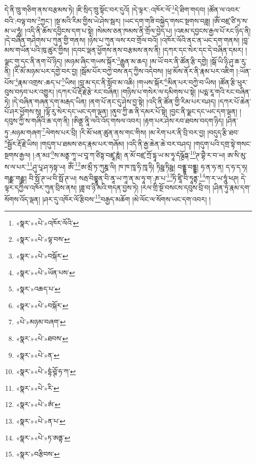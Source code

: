 དེ་ནི་ཁྲུ་གཅིག་ནས་བརྩམས་ཏེ། །ཇི་སྲིད་ཁྲུ་སྟོང་བར་དུའོ། །དེ་ལྟར་:འཁོར་ལོ་\footnote{«སྣར་»«པེ་»འཁོར་ལོའི་}དེ་ཐིག་གདབ། །ཚོན་ལ་འབར་བའི་:བལྟ་བས་\footnote{«སྣར་»«པེ་»ལྟ་བས་}ཀྱང་། །སྔ་མའི་རིམ་གྱིས་ཡེ་ཤེས་སྦར། །ཡང་དག་གཟི་བསྐྱེད་གསང་སྔགས་བཟླ། །ཨོཾ་བཛྲ་ཙི་ཏྲ་ས་མ་ཡ་ཧཱུཾ། །འདི་ནི་ཆོས་དབྱིངས་དག་པ་སྟེ། །སེམས་ཅན་ཁམས་ནི་གྲོལ་བྱེད་པ། །འཇམ་དབྱངས་རྒྱལ་པོ་རང་ཉིད་ནི། །དེ་བཞིན་གཤེགས་པ་ཀུན་གྱི་གནས། །ཉེས་པ་ཀུན་ལས་རབ་གྲོལ་བའོ། །འཁོར་ལོའི་ནང་ན་ཡང་དག་གནས། །བླ་མས་གཡོན་པའི་ཁུ་ཚུར་གྱིས། །དབང་ལྡན་ཕྱོགས་ནས་བརྩམས་ནས་ནི། །དཀར་དང་སེར་དང་དེ་བཞིན་དམར། །ལྗང་གུ་དང་ནི་ནག་པོ་ཉིད། །མཉམ་ཞིང་གཡས་སྐོར་\footnote{«སྣར་»«པེ་»བསྐོར་}རྒྱུན་མ་ཆད། །མ་ཡོ་བར་ནི་ཚོན་རྩི་དགྱེ། །སྒོ་ཡི་ཉི་ཤུ་ཆ་རུ་ནི། །རི་མོ་མཉམ་པར་དགྱེ་བར་བྱ། །སྦོམ་པོར་བཀྱེ་བས་ནད་ཀྱིས་འདེབས། །ཕྲ་མོས་ནོར་ནི་རྣམ་པར་འཇིག །:ཡོན་པོས་\footnote{«སྣར་»«པེ་»ཡོན་པས་}རྣམ་འགྲས་:ཆད་པ་\footnote{«སྣར་»འཆད་པ་}ཡིས། །བླ་མ་དང་ནི་སློབ་མ་འཆི། །གཡས་སྐོར་\footnote{«སྣར་»«པེ་»བསྐོར་}མིན་པར་བཀྱེ་བ་ཡིས། །ཚོན་རྩི་ཕུར་བུས་བཏབ་པར་འགྱུར། །དཀར་པོ་རྡོ་རྗེ་རྩེ་རང་བཞིན། །གཉིས་པ་གསེར་ལ་དམིགས་པ་སྟེ། །པདྨ་རཱ་གའི་རང་བཞིན་ཏེ། །དེ་བཞིན་གཞན་དག་མརྒད་ཡིན། །ནག་པོ་ནང་དུ་ཤེས་བྱ་སྟེ། །འདི་ནི་ཚོན་གྱི་རིམ་པར་བཤད། །དཀར་པོ་ཆེན་པོ་ཤར་ཕྱོགས་སུ། །ལྷོ་རུ་སེར་དང་ཡང་དག་ལྡན། །ནུབ་ཀྱི་ཆ་ནི་དམར་པོ་སྟེ། །བྱང་ནི་ལྗང་དང་ཡང་དག་ལྡན། །དབུས་ཀྱི་ས་གཞིའི་ཆ་དག་ནི། །ཨིནྡྲ་ནཱི་ལའི་འོད་གསལ་འབར། །རྟག་པར་ཤེས་རབ་ཐབས་བདག་ཉིད། །ཤིན་ཏུ་:མཉམ་གཞག་\footnote{«པེ་»མཉམ་བཞག་}ལེགས་པར་བྲི། །རི་མོ་ཕན་ཚུན་ནས་གང་གིས། །མ་རེག་པར་ནི་བྲི་བར་བྱ། །བདུད་རྩི་ཐབ་\footnote{«སྣར་»«པེ་»ཐབས་}སྦྱོར་རྡོ་རྗེ་ཡིས། །གདུག་པ་ཐམས་ཅད་རྣམ་པར་གཞོམ། །འདི་ནི་རྒྱ་ཆེན་ཆེ་བར་བཤད། །གདུག་པའི་དགྲ་སྟེ་གསང་སྔགས་རྒྱལ། །:ན་མཿ་\footnote{«སྣར་»«པེ་»ན་}ས་མནྟ་ཀཱ་ཡ་བཱ་ཀ་ཙིཏྟ་བཛྲཱ་ཎཱཾ། ན་མོ་བཛྲ་ཀྲོ་དྷཱ་ཡ་མ་ཧཱ་དཾཥྚྲོཏྐ་\footnote{«སྣར་»«པེ་»དྷཾ་ཤྚོ་ཧ་ཀ་}ཊ་བྷཻ་ར་བ་ཡ། ཨ་སི་མུ་ས་ལ་པར་\footnote{«སྣར་»«པེ་»རི་}ཤུ་པཱ་ཤ་ཧསྟ་ཡ། ཨོཾ་\footnote{«སྣར་»«པེ་»ཨཾ་}ཨ་མྲྀ་ཏ་ཀུཎྜ་ལི། ཁ་ཁ་ཁཱ་ཧི་ཁཱ་ཧི། ཏིཥྛ་ཏིཥྛ། བནྡྷ་བནྡྷ། ཧ་ན་ཧ་ན། ད་ཧ་ད་ཧ། གརྫྫ་གརྫྫ། བི་སྥོ་ཊ་ཡ་བི་སྥོ་ཊ་ཡ། སརྦ་བིགྷྣཱན་བི་ནཱ་ཡ་ཀཱ་ན་མ་ཧཱ་ག་:ཎ་པ་\footnote{«སྣར་»«པེ་»ན་པ་}ཏི་ཛཱི་བི་ཏཱནྟ་\footnote{«སྣར་»«པེ་»ཏ་ཨནྟ་}ཀ་ར་ཡ་ཧཱུཾ་ཕཊ། དེ་ལྟར་དཀྱིལ་འཁོར་ཀུན་བྲིས་ནས། །ཟླ་བ་ཉི་མའི་གདན་བྱས་ཏེ། །རལ་གྲི་སྔོ་བསངས་དབུས་བྲི་བ། །ཤིན་ཏུ་རྣམ་དག་སོགས་འོད་ལྡན། །ཤར་དུ་འཁོར་ལོ་རྩིབས་\footnote{«སྣར་»བརྩིབས་}བརྒྱད་མཆོག །མེ་ལོང་ལ་སོགས་ཡང་དག་འབར། །
